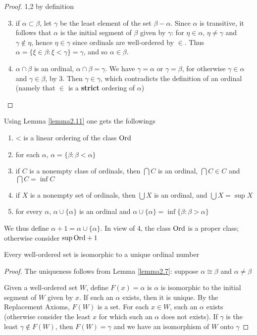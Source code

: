 \documentclass[11pt]{article}
\begin{document}
\begin{proof}
1,2 by definition

\begin{enumerate}
\setcounter{enumi}{2}
\item if \(\alpha\subset\beta\), let \(\gamma\) be the least element of the set \(\beta-\alpha\). Since \(\alpha\) is transitive, it
follows that \(\alpha\) is the initial segment of \(\beta\) given by \(\gamma\): for \(\eta\in\alpha\), \(\eta\neq\gamma\) and \(\gamma\not\in\eta\),
hence \(\eta\in\gamma\) since ordinals are well-ordered by \(\in\). Thus \(\alpha=\{\xi\in\beta:\xi<\gamma\}=\gamma\), and
so \(\alpha\in\beta\).
\item \(\alpha\cap\beta\) is an ordinal, \(\alpha\cap\beta=\gamma\). We have \(\gamma=\alpha\) or \(\gamma=\beta\), for otherwise \(\gamma\in\alpha\)
and \(\gamma\in\beta\), by 3. Then \(\gamma\in\gamma\), which contradicts the definition of an ordinal (namely
that \(\in\) is a \textbf{strict} ordering of \(\alpha\))
\end{enumerate}
\end{proof}

Using Lemma \ref{lemma2.11} one gets the followings
\begin{enumerate}
\item < is a linear ordering of the class \(\text{Ord}\)
\item for each \(\alpha\), \(\alpha=\{\beta:\beta<\alpha\}\) \label{Question1}
\item if \(C\) is a nonempty class of ordinals, then \(\bigcap C\) is an ordinal, \(\bigcap C\in C\)
and \(\bigcap C=\inf C\)
\item if \(X\) is a nonempty set of ordinals, then \(\bigcup X\) is an ordinal, and \(\bigcup X=\sup X\)
\item for every \(\alpha\), \(\alpha\cup\{\alpha\}\) is an ordinal and \(\alpha\cup\{\alpha\}=\inf\{\beta:\beta>\alpha\}\)
\end{enumerate}


We thus define \(\alpha+1=\alpha\cup\{\alpha\}\). In view of 4, the class \(\text{Ord}\) is a proper class; otherwise
consider \(\sup\text{Ord}+1\)

\begin{theorem}[]
Every well-ordered set is isomorphic to a unique ordinal number
\end{theorem}

\begin{proof}
The uniqueness follows from Lemma \ref{lemma2.7}: suppose \(\alpha\cong\beta\) and \(\alpha\neq\beta\)

Given a well-ordered set \(W\),
define \(F(x)=\alpha\) is \(\alpha\) is isomorphic to the initial segment of \(W\) given by \(x\). If such an
\(\alpha\) exists, then it is unique. By the Replacement Axioms, \(F(W)\) is a set. For each \(x\in W\),
such an \(\alpha\) exists (otherwise consider the least \(x\) for which such an \(\alpha\) does not exists). If
\(\gamma\) is the least \(\gamma\not\in F(W)\), then \(F(W)=\gamma\) and we have an isomorphism of \(W\) onto \(\gamma\)
\end{proof}
\end{document}
